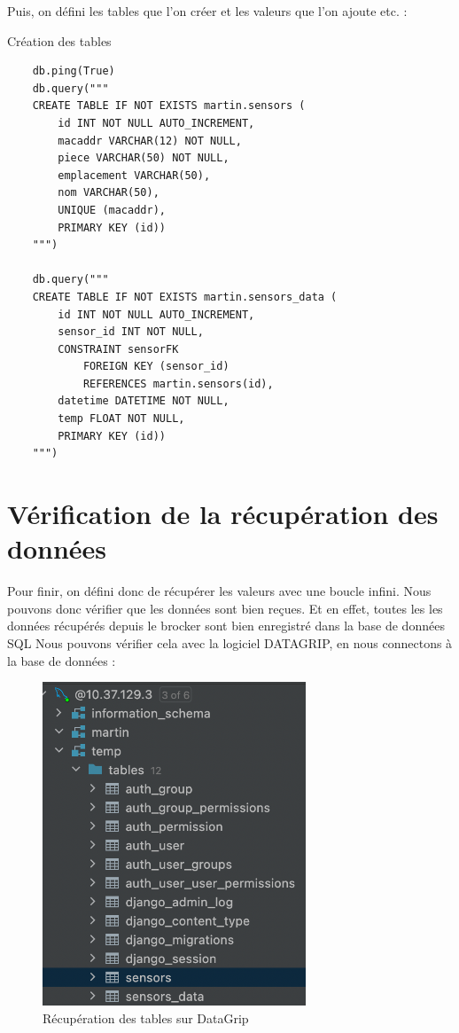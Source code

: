 \documentclass[12pt, a4paper]{article}
\begin{document}
		Puis, on défini les tables que l'on créer et les valeurs que l'on ajoute etc. :
		\begin{listing}[H]
			\caption{Création des tables}
			\label{lst:tables}
			\begin{verbatim}
	db.ping(True)
	db.query("""
	CREATE TABLE IF NOT EXISTS martin.sensors (
		id INT NOT NULL AUTO_INCREMENT,
		macaddr VARCHAR(12) NOT NULL,
		piece VARCHAR(50) NOT NULL,
		emplacement VARCHAR(50),
		nom VARCHAR(50),
		UNIQUE (macaddr),
		PRIMARY KEY (id))
	""")

	db.query("""
	CREATE TABLE IF NOT EXISTS martin.sensors_data (
		id INT NOT NULL AUTO_INCREMENT,
		sensor_id INT NOT NULL,
		CONSTRAINT sensorFK
			FOREIGN KEY (sensor_id)
			REFERENCES martin.sensors(id),
		datetime DATETIME NOT NULL,
		temp FLOAT NOT NULL,
		PRIMARY KEY (id))
	""")
			\end{verbatim}
		\end{listing}
		\newpage 
		\section{Vérification de la récupération des données}
		Pour finir, on défini donc de récupérer les valeurs avec une boucle infini. 
		Nous pouvons donc vérifier que les données sont bien reçues. Et en effet, toutes les
		les données récupérés depuis le brocker sont bien enregistré dans la base de données SQL
		Nous pouvons vérifier cela avec la logiciel DATAGRIP, en nous connectons à la
		base de données : 

		\begin{figure}[H]
			\centering
			\includegraphics[width=0.7\textwidth]{../img/tablesgrip.png}
			\caption{Récupération des tables sur DataGrip}
			\label{fig:table}
		\end{figure}
\end{document}
